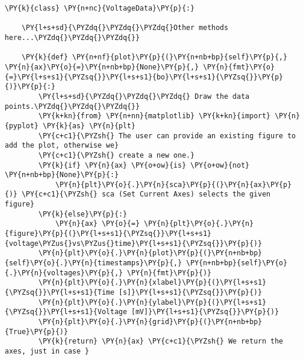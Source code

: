 \begin{Verbatim}[label=\makebox{\url{https://github.com/lucabaldini/cmepda/tree/master/slides/latex/snippets/voltage\_data\_3.py}},commandchars=\\\{\}]
\PY{k}{class} \PY{n+nc}{VoltageData}\PY{p}{:}

    \PY{l+s+sd}{\PYZdq{}\PYZdq{}\PYZdq{}Other methods here...\PYZdq{}\PYZdq{}\PYZdq{}}

    \PY{k}{def} \PY{n+nf}{plot}\PY{p}{(}\PY{n+nb+bp}{self}\PY{p}{,} \PY{n}{ax}\PY{o}{=}\PY{n+nb+bp}{None}\PY{p}{,} \PY{n}{fmt}\PY{o}{=}\PY{l+s+s1}{\PYZsq{}}\PY{l+s+s1}{bo}\PY{l+s+s1}{\PYZsq{}}\PY{p}{)}\PY{p}{:}
        \PY{l+s+sd}{\PYZdq{}\PYZdq{}\PYZdq{} Draw the data points.\PYZdq{}\PYZdq{}\PYZdq{}}
        \PY{k+kn}{from} \PY{n+nn}{matplotlib} \PY{k+kn}{import} \PY{n}{pyplot} \PY{k}{as} \PY{n}{plt}
        \PY{c+c1}{\PYZsh{} The user can provide an existing figure to add the plot, otherwise we}
        \PY{c+c1}{\PYZsh{} create a new one.}
        \PY{k}{if} \PY{n}{ax} \PY{o+ow}{is} \PY{o+ow}{not} \PY{n+nb+bp}{None}\PY{p}{:}
            \PY{n}{plt}\PY{o}{.}\PY{n}{sca}\PY{p}{(}\PY{n}{ax}\PY{p}{)} \PY{c+c1}{\PYZsh{} sca (Set Current Axes) selects the given figure}
        \PY{k}{else}\PY{p}{:}
            \PY{n}{ax} \PY{o}{=} \PY{n}{plt}\PY{o}{.}\PY{n}{figure}\PY{p}{(}\PY{l+s+s1}{\PYZsq{}}\PY{l+s+s1}{voltage\PYZus{}vs\PYZus{}time}\PY{l+s+s1}{\PYZsq{}}\PY{p}{)}
        \PY{n}{plt}\PY{o}{.}\PY{n}{plot}\PY{p}{(}\PY{n+nb+bp}{self}\PY{o}{.}\PY{n}{timestamps}\PY{p}{,} \PY{n+nb+bp}{self}\PY{o}{.}\PY{n}{voltages}\PY{p}{,} \PY{n}{fmt}\PY{p}{)}
        \PY{n}{plt}\PY{o}{.}\PY{n}{xlabel}\PY{p}{(}\PY{l+s+s1}{\PYZsq{}}\PY{l+s+s1}{Time [s]}\PY{l+s+s1}{\PYZsq{}}\PY{p}{)}
        \PY{n}{plt}\PY{o}{.}\PY{n}{ylabel}\PY{p}{(}\PY{l+s+s1}{\PYZsq{}}\PY{l+s+s1}{Voltage [mV]}\PY{l+s+s1}{\PYZsq{}}\PY{p}{)}
        \PY{n}{plt}\PY{o}{.}\PY{n}{grid}\PY{p}{(}\PY{n+nb+bp}{True}\PY{p}{)}
        \PY{k}{return} \PY{n}{ax} \PY{c+c1}{\PYZsh{} We return the axes, just in case }
\end{Verbatim}